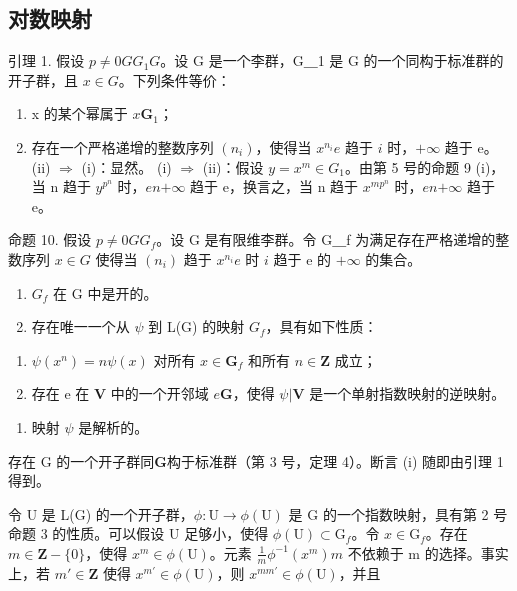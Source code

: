 \subsection{对数映射}

引理 1. 假设 \(p \neq 0\)\(G\)\(G_1\)\(G\)。设 G 是一个李群，G＿1 是 G 的一个同构于标准群的开子群，且 \(x \in G\)。下列条件等价：

\begin{enumerate}
\def\labelenumi{(\roman{enumi})}
\item
  x 的某个幂属于 \(x\)\(\mathbf{G}_1\)；
\item
  存在一个严格递增的整数序列 \((n_{i})\)，使得当 \(x^{n_{i}}\)\(e\) 趋于 \(i\) 时，\(+\infty\) 趋于 e。
  (ii) \(\Rightarrow\) (i)：显然。
  (i) \(\Rightarrow\) (ii)：假设 \(y = x^{m} \in G_{1}\)。由第 5 号的命题 9 (i)，当 n 趋于 \(y^{p^n}\) 时，\(e\)\(n\)\(+\infty\) 趋于 e，换言之，当 n 趋于 \(x^{mp^n}\) 时，\(e\)\(n\)\(+\infty\) 趋于 e。
\end{enumerate}

命题 10. 假设 \(p \neq 0\)\(G\)\(G_f\)。设 G 是有限维李群。令 G＿f 为满足存在严格递增的整数序列 \(x \in G\) 使得当 \((n_i)\) 趋于 \(x^{n_i}\)\(e\) 时 \(i\) 趋于 e 的 \(+\infty\) 的集合。

\begin{enumerate}
\def\labelenumi{(\roman{enumi})}
\item
  \(G_{f}\) 在 G 中是开的。
\item
  存在唯一一个从 \(\psi\) 到 L(G) 的映射 \(G_{f}\)，具有如下性质：
\end{enumerate}

\begin{enumerate}
\def\labelenumi{(\alph{enumi})}
\item
  \(\psi (x^n) = n\psi (x)\) 对所有 \(x\in \mathbf{G}_f\) 和所有 \(n\in \mathbf{Z}\) 成立；
\item
  存在 e 在 \(\mathbf{V}\) 中的一个开邻域 \(e\)\(\mathbf{G}\)，使得 \(\psi |\mathbf{V}\) 是一个单射指数映射的逆映射。
\end{enumerate}

\begin{enumerate}
\def\labelenumi{(\roman{enumi})}
\setcounter{enumi}{2}
\tightlist
\item
  映射 \(\psi\) 是解析的。
\end{enumerate}

存在 G 的一个开子群同\(\mathbf{G}\)构于标准群（第 3 号，定理 4）。断言 (i) 随即由引理 1 得到。

令 U 是 L(G) 的一个开子群，\(\phi\colon\mathrm{U}\to\phi(\mathrm{U})\) 是 G 的一个指数映射，具有第 2 号命题 3 的性质。可以假设 U 足够小，使得 \(\phi(\mathrm{U})\subset\mathrm{G}_{f}\)。令 \(x\in\mathrm{G}_{f}\)。存在 \(m\in\mathbf{Z}-\{0\}\)，使得 \(x^{m}\in\phi(\mathrm{U})\)。元素 \(\frac{1}{m}\phi^{-1}(x^{m})\)\(m\) 不依赖于 m 的选择。事实上，若 \(m'\in\mathbf{Z}\) 使得 \(x^{m'}\in\phi(\mathrm{U})\)，则 \(x^{mm'}\in\phi(\mathrm{U})\)，并且

